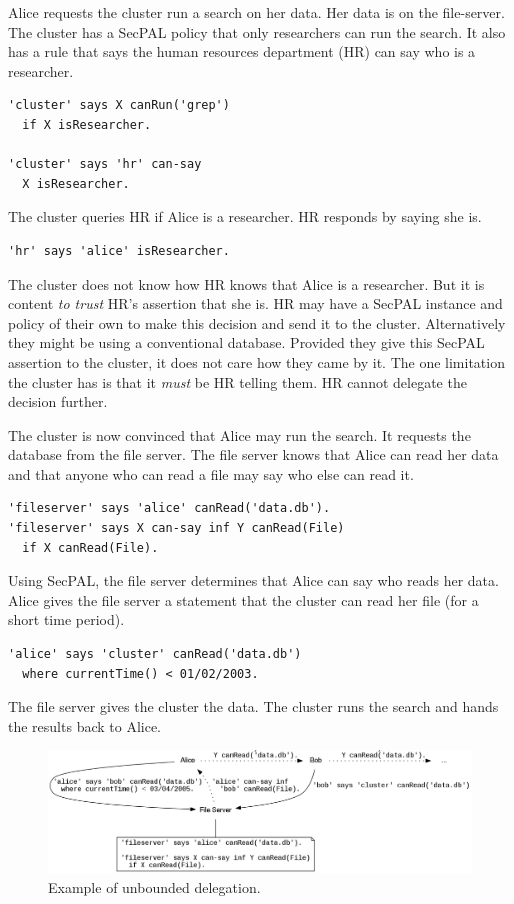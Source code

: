 \documentclass[thesis.tex]{subfiles}
\begin{document}
Alice requests the cluster run a search on her data.  Her data is on the file-server.
The cluster has a SecPAL policy that only researchers can run the search.
It also has a rule that says the human resources department (HR) can say who is a researcher.
\begin{lstlisting}
'cluster' says X canRun('grep')
  if X isResearcher.

'cluster' says 'hr' can-say
  X isResearcher.
\end{lstlisting}
The cluster queries HR if Alice is a researcher. HR responds by saying she is.
\begin{lstlisting}
'hr' says 'alice' isResearcher.
\end{lstlisting}
The cluster does not know how HR knows that Alice is a researcher. But it
is content \emph{to trust} HR's assertion that she is.  HR may have a SecPAL
instance and policy of their own to make this decision and send it to the
cluster. Alternatively they might be using a conventional database.  Provided
they give this SecPAL assertion to the cluster, it does not care
how they came by it.  The one limitation the cluster has is that it
\emph{must} be HR telling them. HR cannot delegate the decision
further.

The cluster is now convinced that Alice may run the search.
It requests the database from the file server.  The file
server knows that Alice can read her data and that anyone who can read
a file may say who else can read it.
\begin{lstlisting}
'fileserver' says 'alice' canRead('data.db').
'fileserver' says X can-say inf Y canRead(File)
  if X canRead(File).
\end{lstlisting}
Using SecPAL, the file server determines that Alice can say who
reads her data.  Alice gives the file server a statement that
the cluster can read her file (for a short time
period).
\begin{lstlisting}
'alice' says 'cluster' canRead('data.db')
  where currentTime() < 01/02/2003.
\end{lstlisting}
The file server gives the cluster the data.
The cluster runs the search and hands the results back to Alice.

\begin{figure}
  \centering
  \includegraphics[width=\textwidth]{figures/secpal-example-delegation.png}
  \caption{Example of unbounded delegation.}
  \label{fig:unbounded-example}
\end{figure}
\end{document}
